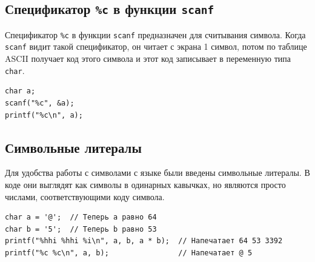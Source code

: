 \documentclass{article}
\begin{document}
\subsection*{Спецификатор \texttt{\%c} в функции \texttt{scanf}}
Спецификатор \texttt{\%c} в функции \texttt{scanf} предназначен для считывания символа.
Когда \texttt{scanf} видит такой спецификатор, он читает с экрана 1 символ, потом по таблице ASCII
получает код этого символа и этот код записывает в переменную типа \texttt{char}.
\begin{lstlisting}
char a; 
scanf("%c", &a);
printf("%c\n", a);
\end{lstlisting}

\subsection*{Символьные литералы}
Для удобства работы с символами с языке были введены символьные литералы. В коде они выглядят как символы в одинарных кавычках, но являются просто числами, соответствующими коду символа.
\begin{lstlisting}
char a = '@';  // Теперь a равно 64
char b = '5';  // Теперь b равно 53
printf("%hhi %hhi %i\n", a, b, a * b);  // Напечатает 64 53 3392
printf("%c %c\n", a, b);				// Напечатает @ 5
\end{lstlisting}
\end{document}
